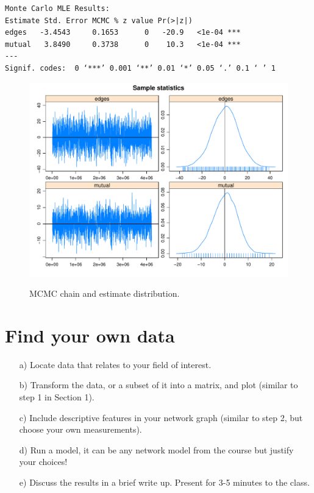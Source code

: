 \documentclass[12pt,letterpaper]{article}
\begin{document}
  

\begin{verbatim}
Monte Carlo MLE Results:
Estimate Std. Error MCMC % z value Pr(>|z|)    
edges   -3.4543     0.1653      0   -20.9   <1e-04 ***
mutual   3.8490     0.3738      0    10.3   <1e-04 ***
---
Signif. codes:  0 ‘***’ 0.001 ‘**’ 0.01 ‘*’ 0.05 ‘.’ 0.1 ‘ ’ 1
\end{verbatim}

\begin{figure}[h!]\centering
	\caption{\footnotesize{MCMC chain and estimate distribution.}}\label{fig:figure2}
	\includegraphics[width=.7\textwidth]{figure2.pdf}\\
\end{figure}

\section{Find your own data}

\begin{itemize}
	\item[a)] Locate data that relates to your field of interest.
	\item[b)] Transform the data, or a subset of it into a matrix, and plot (similar to step 1 in Section 1).
	\item [c)] Include descriptive features in your network graph (similar to step 2, but choose your own measurements).
	\item [d)] Run a model, it can be any network model from the course but justify your choices! 
	\item [e)] Discuss the results in a brief write up. Present for 3-5 minutes to the class.
\end{itemize}

%  
\end{document}

